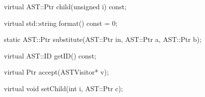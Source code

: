 \begin{apient}
virtual AST::Ptr child(unsigned i) const;
\end{apient}

\begin{apient}
virtual std::string format() const = 0;
\end{apient}

\begin{apient}
static AST::Ptr substitute(AST::Ptr in, AST::Ptr a, AST::Ptr b);
\end{apient}

\begin{apient}
virtual AST::ID getID() const;
\end{apient}

\begin{apient}
virtual Ptr accept(ASTVisitor* v);
\end{apient}

\begin{apient}
virtual void setChild(int i, AST::Ptr c);
\end{apient}
